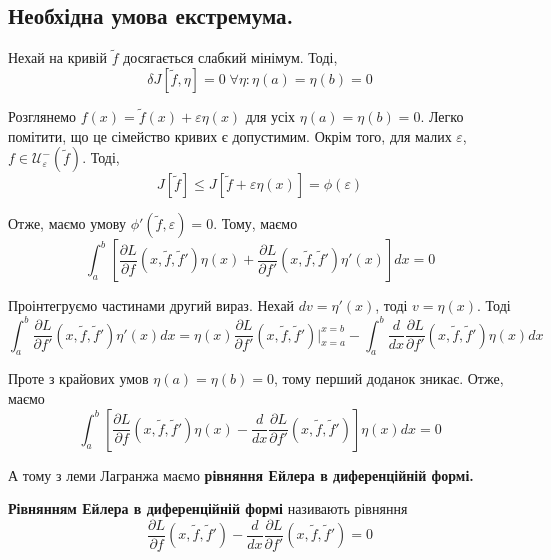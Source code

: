 \documentclass[14pt]{extarticle}
\newcommand{\<}{\langle}
\renewcommand{\>}{\rangle}
\theoremstyle{mystyle}{\newtheorem{definition}{Definition}[section]}
\theoremstyle{mystyle}{\newtheorem{proposition}[definition]{Proposition}}
\theoremstyle{mystyle}{\newtheorem{theorem}[definition]{Theorem}}
\theoremstyle{mystyle}{\newtheorem{lemma}[definition]{Lemma}}
\theoremstyle{mystyle}{\newtheorem{corollary}[definition]{Corollary}}
\theoremstyle{mystyle}{\newtheorem*{remark}{Remark}}
\theoremstyle{mystyle}{\newtheorem*{remarks}{Remarks}}
\theoremstyle{mystyle}{\newtheorem*{example}{Example}}
\theoremstyle{mystyle}{\newtheorem*{examples}{Examples}}
\theoremstyle{definition}{\newtheorem*{exercise}{Exercise}}
\theoremstyle{cstyle}{\newtheorem*{cthm}{}}
\theoremstyle{warn}
\begin{document}
\subsection{Необхідна умова екстремума.}

Нехай на кривій $\widetilde{f}$ досягається слабкий мінімум. Тоді, 
\begin{equation}
    \delta J[\widetilde{f},\eta] = 0 \; \forall \eta: \eta(a) = \eta(b) = 0
\end{equation}

Розглянемо $f(x) = \widetilde{f}(x) + \varepsilon\eta(x)$ для усіх $\eta(a)=\eta(b)=0$. Легко помітити, що
це сімейство кривих є допустимим. Окрім того, для малих $\varepsilon$, $f \in \mathcal{U}_{\varepsilon}^-(\widetilde{f})$. Тоді,
\begin{equation}
    J[\widetilde{f}] \leq J[\widetilde{f} + \varepsilon \eta(x)] = \phi(\varepsilon)
\end{equation}

Отже, маємо умову $\phi'(\widetilde{f},\varepsilon)=0$. Тому, маємо
\begin{equation}
    \int_a^b\left[\frac{\partial L}{\partial f}(x,\widetilde{f},\widetilde{f}')\eta(x) + \frac{\partial L}{\partial f'}(x,\widetilde{f},\widetilde{f}')\eta'(x)\right]dx = 0
\end{equation}

Проінтегруємо частинами другий вираз. Нехай $dv=\eta'(x)$, тоді $v=\eta(x)$. Тоді
\begin{equation}
    \int_a^b\frac{\partial L}{\partial f'}(x,\widetilde{f},\widetilde{f}')\eta'(x)dx = \eta(x)\frac{\partial L}{\partial f'}(x,\widetilde{f},\widetilde{f}')\Big|_{x=a}^{x=b} - \int_a^b \frac{d}{dx}\frac{\partial L}{\partial f'}(x, \widetilde{f},\widetilde{f}')\eta(x)dx
\end{equation}

Проте з крайових умов $\eta(a)=\eta(b)=0$, тому перший доданок зникає. Отже, маємо
\begin{equation}
    \int_a^b\left[\frac{\partial L}{\partial f}(x,\widetilde{f},\widetilde{f}')\eta(x) - \frac{d}{dx}\frac{\partial L}{\partial f'}(x,\widetilde{f},\widetilde{f}')\right]\eta(x)dx = 0
\end{equation}

А тому з леми Лагранжа маємо \textbf{рівняння Ейлера в диференційній формі.}

\begin{definition}
\textbf{Рівнянням Ейлера в диференційній формі} називають рівняння
\begin{equation}
    \frac{\partial L}{\partial f}(x,\widetilde{f},\widetilde{f}') - \frac{d}{dx}\frac{\partial L}{\partial f'}(x,\widetilde{f},\widetilde{f}') = 0
\end{equation}
\end{definition}
\end{document}
